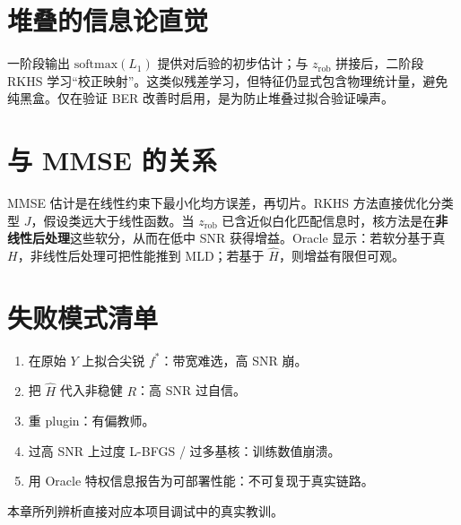 \section{堆叠的信息论直觉}

一阶段输出 $\mathrm{softmax}(L_1)$ 提供对后验的初步估计；与 $z_{\mathrm{rob}}$ 拼接后，二阶段 RKHS 学习“校正映射”。这类似残差学习，但特征仍显式包含物理统计量，避免纯黑盒。仅在验证 BER 改善时启用，是为防止堆叠过拟合验证噪声。

\section{与 MMSE 的关系}

MMSE 估计是在线性约束下最小化均方误差，再切片。RKHS 方法直接优化分类型 $J$，假设类远大于线性函数。当 $z_{\mathrm{rob}}$ 已含近似白化匹配信息时，核方法是在\textbf{非线性后处理}这些软分，从而在低中 SNR 获得增益。Oracle 显示：若软分基于真 $H$，非线性后处理可把性能推到 MLD；若基于 $\hat H$，则增益有限但可观。

\section{失败模式清单}

\begin{enumerate}[leftmargin=2em]
  \item 在原始 $Y$ 上拟合尖锐 $f^*$：带宽难选，高 SNR 崩。
  \item 把 $\hat H$ 代入非稳健 $R$：高 SNR 过自信。
  \item 重 plugin：有偏教师。
  \item 过高 SNR 上过度 L-BFGS / 过多基核：训练数值崩溃。
  \item 用 Oracle 特权信息报告为可部署性能：不可复现于真实链路。
\end{enumerate}
本章所列辨析直接对应本项目调试中的真实教训。
